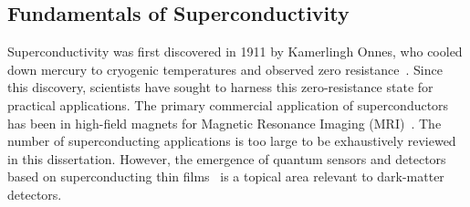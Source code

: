     \subsection{Fundamentals of Superconductivity}

    Superconductivity was first discovered in 1911 by Kamerlingh Onnes, who cooled down mercury to cryogenic temperatures and observed zero resistance~\cite{onnesLiquefactionHelium1991}. Since this discovery, scientists have sought to harness this zero-resistance state for practical applications. The primary commercial application of superconductors has been in high-field magnets for Magnetic Resonance Imaging (MRI)~\cite{cooleyBusinessModelsAssure2023}. The number of superconducting applications is too large to be exhaustively reviewed in this dissertation. However, the emergence of quantum sensors and detectors based on superconducting thin films~\cite{irwinTransitionEdgeSensors2005, mazinSuperconductingMaterialsMicrowave2021} is a topical area relevant to dark-matter detectors.
    
